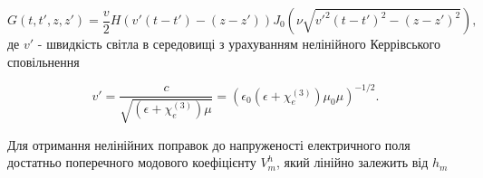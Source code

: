 \begin{equation*}
G(t,t',z,z') = \frac{v}{2} H \left( v' (t-t') - (z-z') \right)
J_0 \left( \nu \sqrt{v'^2 (t-t')^2 - (z-z')^2} \right),
\end{equation*}
%
де $ v' $ - швидкість світла в середовищі з урахуванням нелінійного 
Керрівського сповільнення

\begin{equation}
v' = \frac{c}{\sqrt{ \left(\epsilon + \chi_e^{(3)}\right) \mu}} = 
\left( \epsilon_0 
\left( \epsilon + \chi_e^{(3)} \right) \mu_0 \mu \right)^{-1/2}.
\end{equation}

Для отримання нелінійних поправок до напруженості електричного поля достатньо 
поперечного модового коефіцієнту $ V_m^h $, який лінійно залежить від $ h_m $

